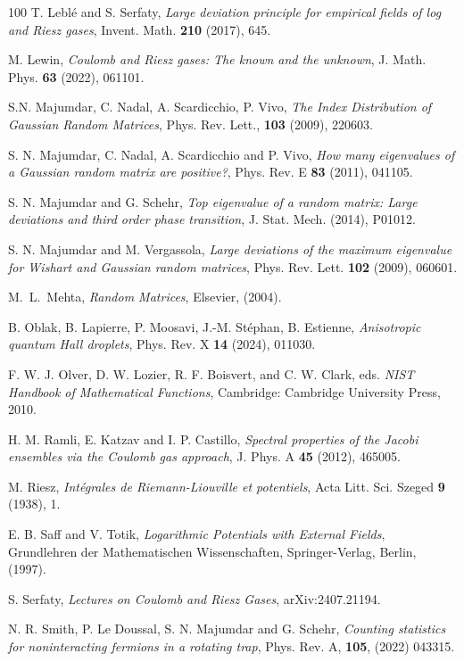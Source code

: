 \documentclass[10pt]{amsart}
\theoremstyle{plain}
\theoremstyle{remark}
\numberwithin{equation}{section}
\begin{document}
\begin{thebibliography}{100}
 T. Leblé and S. Serfaty, \emph{Large deviation principle for empirical fields of log and Riesz gases}, Invent. Math. \textbf{210} (2017), 645.%


M. Lewin, {\it Coulomb and Riesz gases: The known and the unknown}, J. Math. Phys. {\bf 63}  (2022), 061101. %


S.N. Majumdar, C. Nadal, A. Scardicchio, P. Vivo,
{\it The Index Distribution of Gaussian Random Matrices},
Phys. Rev. Lett., \textbf{103} (2009), 220603.


 S. N. Majumdar, C. Nadal, A. Scardicchio and P. Vivo, \emph{How many eigenvalues of a Gaussian random matrix are positive?}, Phys. Rev. E \textbf{83} (2011), 041105. 

 S. N. Majumdar and G. Schehr, \emph{Top eigenvalue of a random matrix: Large deviations and third order phase transition}, J. Stat. Mech. (2014), P01012.

 S. N. Majumdar and M. Vergassola, \emph{Large deviations of the maximum eigenvalue for Wishart and Gaussian random matrices}, Phys. Rev. Lett. \textbf{102} (2009), 060601.

M.~L.~Mehta, {\it Random Matrices}, Elsevier, (2004).  

B. Oblak, B. Lapierre, P. Moosavi, J.-M. St{\'e}phan, B. Estienne, {\it Anisotropic quantum Hall droplets}, Phys. Rev. X {\bf 14} (2024), 011030.

  F. W. J. Olver, D. W. Lozier, R. F. Boisvert, and C. W. Clark, eds. \emph{NIST Handbook of Mathematical Functions}, Cambridge: Cambridge University Press, 2010.


 H. M. Ramli, E. Katzav and I. P. Castillo, \emph{Spectral properties of the Jacobi ensembles via the Coulomb gas approach}, J. Phys. A \textbf{45} (2012), 465005.

 M. Riesz, \emph{Intégrales de Riemann-Liouville et potentiels}, Acta Litt. Sci. Szeged \textbf{9} (1938), 1.%


 E. B. Saff and V. Totik, \emph{Logarithmic Potentials with External Fields}, Grundlehren der Mathematischen Wissenschaften, Springer-Verlag, Berlin, (1997).

 S. Serfaty, \emph{Lectures on Coulomb and Riesz Gases}, arXiv:2407.21194.  

N. R. Smith, P. Le Doussal, S. N. Majumdar and G. Schehr,  {\it Counting statistics for noninteracting fermions in a rotating trap}, Phys. Rev. A, {\bf 105}, (2022) 043315.

\end{thebibliography}
\end{document}
